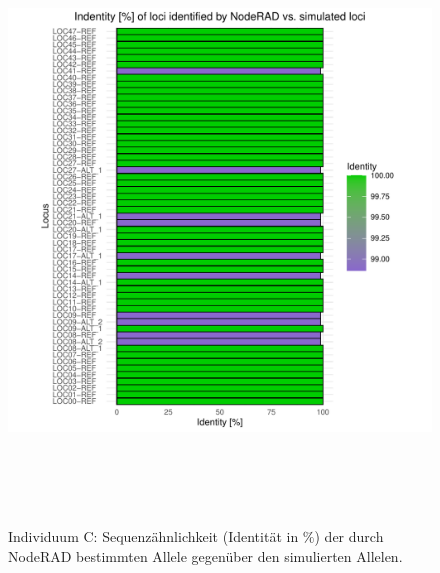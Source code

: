 \begin{figure}[H]
	\begin{center}
		\includegraphics[height=16cm]{bilder/evaluation/perc_ident/C.plot_loci.pdf}
		\caption{Individuum C: Sequenzähnlichkeit (Identität in $ \% $) der durch NodeRAD bestimmten Allele gegenüber den simulierten Allelen.}
	\end{center}
\end{figure}

